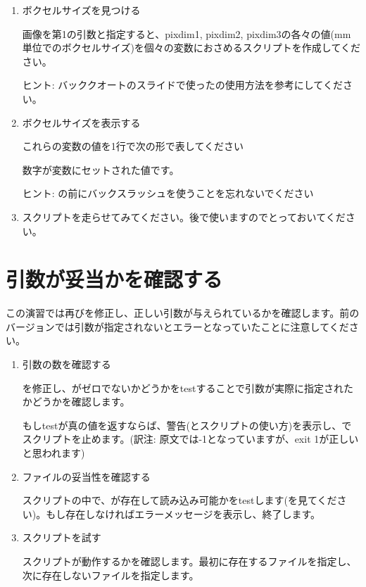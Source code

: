 \documentclass{jsarticle}
\begin{document}
\begin{enumerate}
\item ボクセルサイズを見つける

画像を第1の引数と指定すると、pixdim1, pixdim2, pixdim3の各々の値(mm単位でのボクセルサイズ)を個々の変数におさめるスクリプトを作成してください。

ヒント: バッククオートのスライドで使った{\color{red}}の使用方法を参考にしてください。

\item ボクセルサイズを表示する

これらの変数の値を1行で次の形で表してください

{\color{red}}

数字が変数にセットされた値です。

ヒント: {\color{red}\Q{*}}の前にバックスラッシュを使うことを忘れないでください

\item スクリプトを走らせてみてください。後で使いますのでとっておいてください。

\end{enumerate}

\section{引数が妥当かを確認する}

この演習では再び{\color{red}}を修正し、正しい引数が与えられているかを確認します。前のバージョンでは引数が指定されないとエラーとなっていたことに注意してください。

\begin{enumerate}
\item 引数の数を確認する

{\color{red}}を修正し、{\color{red}{\tt \$\#}}がゼロでないかどうかをtestすることで引数が実際に指定されたかどうかを確認します。

もしtestが真の値を返すならば、警告(とスクリプトの使い方)を表示し、{\color{red}}でスクリプトを止めます。(訳注: 原文では-1となっていますが、exit 1が正しいと思われます)

\item ファイルの妥当性を確認する

スクリプトの中で、{}が存在して読み込み可能かをtestします({\color{red}}を見てください)。もし存在しなければエラーメッセージを表示し、終了します。

\item スクリプトを試す

スクリプトが動作するかを確認します。最初に存在するファイルを指定し、次に存在しないファイルを指定します。

\end{enumerate}
\end{document}
